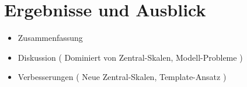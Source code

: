 %
\section{Ergebnisse und Ausblick}
\label{energy_calibration:ergebnisse_und_ausblick}
\begin{itemize}
    \item Zusammenfassung
    \item Diskussion ( Dominiert von Zentral-Skalen, Modell-Probleme )
    \item Verbesserungen ( Neue Zentral-Skalen, Template-Ansatz )
\end{itemize}


